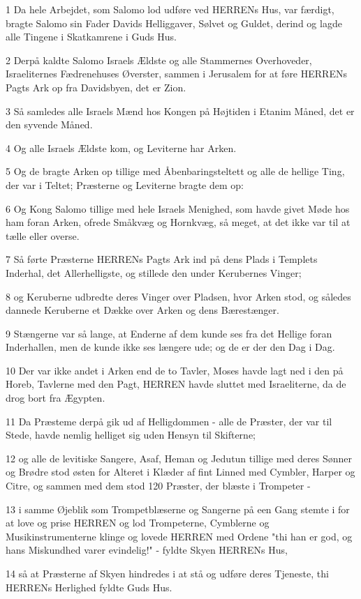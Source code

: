 \par 1 Da hele Arbejdet, som Salomo lod udføre ved HERRENs Hus, var færdigt, bragte Salomo sin Fader Davids Helliggaver, Sølvet og Guldet, derind og lagde alle Tingene i Skatkamrene i Guds Hus.
\par 2 Derpå kaldte Salomo Israels Ældste og alle Stammernes Overhoveder, Israeliternes Fædrenehuses Øverster, sammen i Jerusalem for at føre HERRENs Pagts Ark op fra Davidsbyen, det er Zion.
\par 3 Så samledes alle Israels Mænd hos Kongen på Højtiden i Etanim Måned, det er den syvende Måned.
\par 4 Og alle Israels Ældste kom, og Leviterne har Arken.
\par 5 Og de bragte Arken op tillige med Åbenbaringsteltett og alle de hellige Ting, der var i Teltet; Præsterne og Leviterne bragte dem op:
\par 6 Og Kong Salomo tillige med hele Israels Menighed, som havde givet Møde hos ham foran Arken, ofrede Småkvæg og Hornkvæg, så meget, at det ikke var til at tælle eller overse.
\par 7 Så førte Præsterne HERRENs Pagts Ark ind på dens Plads i Templets Inderhal, det Allerhelligste, og stillede den under Kerubernes Vinger;
\par 8 og Keruberne udbredte deres Vinger over Pladsen, hvor Arken stod, og således dannede Keruberne et Dække over Arken og dens Bærestænger.
\par 9 Stængerne var så lange, at Enderne af dem kunde ses fra det Hellige foran Inderhallen, men de kunde ikke ses længere ude; og de er der den Dag i Dag.
\par 10 Der var ikke andet i Arken end de to Tavler, Moses havde lagt ned i den på Horeb, Tavlerne med den Pagt, HERREN havde sluttet med Israeliterne, da de drog bort fra Ægypten.
\par 11 Da Præsteme derpå gik ud af Helligdommen - alle de Præster, der var til Stede, havde nemlig helliget sig uden Hensyn til Skifterne;
\par 12 og alle de levitiske Sangere, Asaf, Heman og Jedutun tillige med deres Sønner og Brødre stod østen for Alteret i Klæder af fint Linned med Cymbler, Harper og Citre, og sammen med dem stod 120 Præster, der blæste i Trompeter -
\par 13 i samme Øjeblik som Trompetblæserne og Sangerne på een Gang stemte i for at love og prise HERREN og lod Trompeterne, Cymblerne og Musikinstrumenterne klinge og lovede HERREN med Ordene "thi han er god, og hans Miskundhed varer evindelig!" - fyldte Skyen HERRENs Hus,
\par 14 så at Præsterne af Skyen hindredes i at stå og udføre deres Tjeneste, thi HERRENs Herlighed fyldte Guds Hus.

